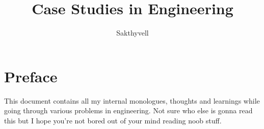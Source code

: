 \documentclass[11pt]{article}
\title{Case Studies in Engineering}
\author{Sakthyvell}
\begin{document}
\maketitle
\tableofcontents

\section{Preface}
This document contains all my internal monologues, thoughts and learnings while going through various problems in engineering. Not sure who else is gonna read this but I hope you're not bored out of your mind reading noob stuff.







\end{document}

